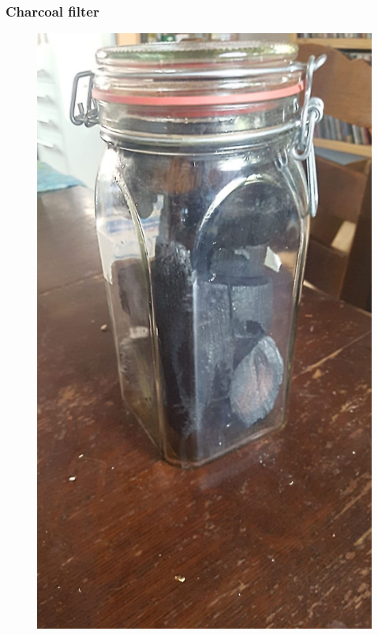 \documentclass{beamer}
\begin{document}
\begin{frame}
\frametitle{Charcoal filter}
\begin{figure}
\includegraphics[height=.7\textheight]{images/charcoal-filter.jpeg}
\end{figure}
\end{frame}
\end{document}
